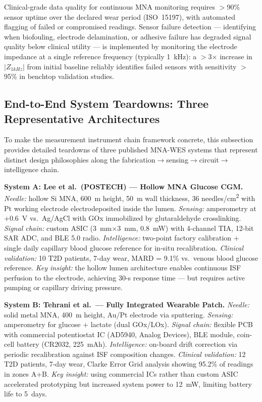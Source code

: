 \documentclass[review,1p]{elsarticle}
\begin{document}
Clinical-grade data quality for continuous MNA monitoring requires $>$90\% sensor uptime over the declared wear period (ISO~15197), with automated flagging of failed or compromised readings. Sensor failure detection — identifying when biofouling, electrode delamination, or adhesive failure has degraded signal quality below clinical utility — is implemented by monitoring the electrode impedance at a single reference frequency (typically 1~kHz): a $>$3$\times$ increase in $|Z_{1kHz}|$ from initial baseline reliably identifies failed sensors with sensitivity $>$95\% in benchtop validation studies.

\subsection{End-to-End System Teardowns: Three Representative Architectures}
\label{subsec:teardowns}

To make the measurement instrument chain framework concrete, this subsection provides detailed teardowns of three published MNA-WES systems that represent distinct design philosophies along the fabrication$\to$sensing$\to$circuit$\to$intelligence chain.

\textbf{System A: Lee et al.\ (POSTECH) — Hollow MNA Glucose CGM.}
\textit{Needle:} hollow Si MNA, 600~\textmu{}m height, 50~\textmu{}m wall thickness, 36 needles/cm\textsuperscript{2} with Pt working electrode electrodeposited inside the lumen. \textit{Sensing:} amperometry at +0.6~V vs.\ Ag/AgCl with GOx immobilized by glutaraldehyde crosslinking. \textit{Signal chain:} custom ASIC (3~mm$\times$3~mm, 0.8~mW) with 4-channel TIA, 12-bit SAR ADC, and BLE 5.0 radio. \textit{Intelligence:} two-point factory calibration + single daily capillary blood glucose reference for in-situ recalibration. \textit{Clinical validation:} 10 T2D patients, 7-day wear, MARD = 9.1\% vs.\ venous blood glucose reference. \textit{Key insight:} the hollow lumen architecture enables continuous ISF perfusion to the electrode, achieving 30-s response time — but requires active pumping or capillary driving pressure.

\textbf{System B: Tehrani et al.\ — Fully Integrated Wearable Patch.}
\textit{Needle:} solid metal MNA, 400~\textmu{}m height, Au/Pt electrode via sputtering. \textit{Sensing:} amperometry for glucose + lactate (dual GOx/LOx). \textit{Signal chain:} flexible PCB with commercial potentiostat IC (AD5940, Analog Devices), BLE module, coin-cell battery (CR2032, 225~mAh). \textit{Intelligence:} on-board drift correction via periodic recalibration against ISF composition changes. \textit{Clinical validation:} 12 T2D patients, 7-day wear, Clarke Error Grid analysis showing 95.2\% of readings in zones A+B. \textit{Key insight:} using commercial ICs rather than custom ASIC accelerated prototyping but increased system power to 12~mW, limiting battery life to 5~days.
\end{document}
